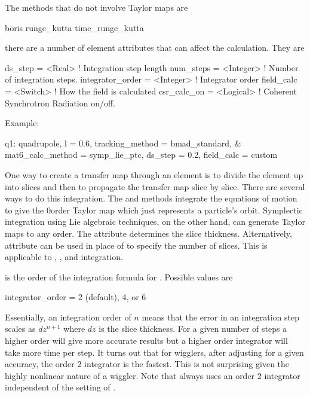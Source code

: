 The methods that do not involve Taylor maps are
\begin{example}
  boris
  runge_kutta
  time_runge_kutta
\end{example}

there are a number of element attributes that can affect the
calculation. They are
\begin{example}
  ds_step = <Real>              ! Integration step length
  num_steps = <Integer>         ! Number of integration steps.
  integrator_order = <Integer>  ! Integrator order
  field_calc = <Switch>         ! How the field is calculated
  csr_calc_on = <Logical>       ! Coherent Synchrotron Radiation on/off.
\end{example}

Example:
\begin{example}
  q1: quadrupole, l = 0.6, tracking_method = bmad_standard, &
        mat6_calc_method = symp_lie_ptc, ds_step = 0.2, field_calc = custom
\end{example}

One way to create a transfer map through an element is to divide the
element up into slices and then to propagate the transfer map slice by
slice.  There are several ways to do this integration. The 
and  methods integrate the equations of motion to
give the 0\Th order Taylor map which just represents a particle's
orbit.  Symplectic integration using Lie
algebraic techniques, on the other hand, can generate Taylor maps to
any order.  The  attribute determines the slice thickness.
Alternatively,  attribute can be used in place of
 to specify the number of slices.
This is applicable to , , and
 integration.

 is the order of the integration formula for 
. Possible values are
\begin{example}
  integrator_order = 2 (default), 4, or 6
\end{example}
Essentially, an integration order of $n$ means that the error in an
integration step scales as $dz^{n+1}$ where $dz$ is the slice
thickness.  For a given number of steps a higher order will give more
accurate results but a higher order integrator will take more time per
step. It turns out that for wigglers, after adjusting 
for a given accuracy, the order 2 integrator is the fastest. This is
not surprising given the highly nonlinear nature of a wiggler. Note
that  always uses an order 2 integrator
independent of the setting of .

